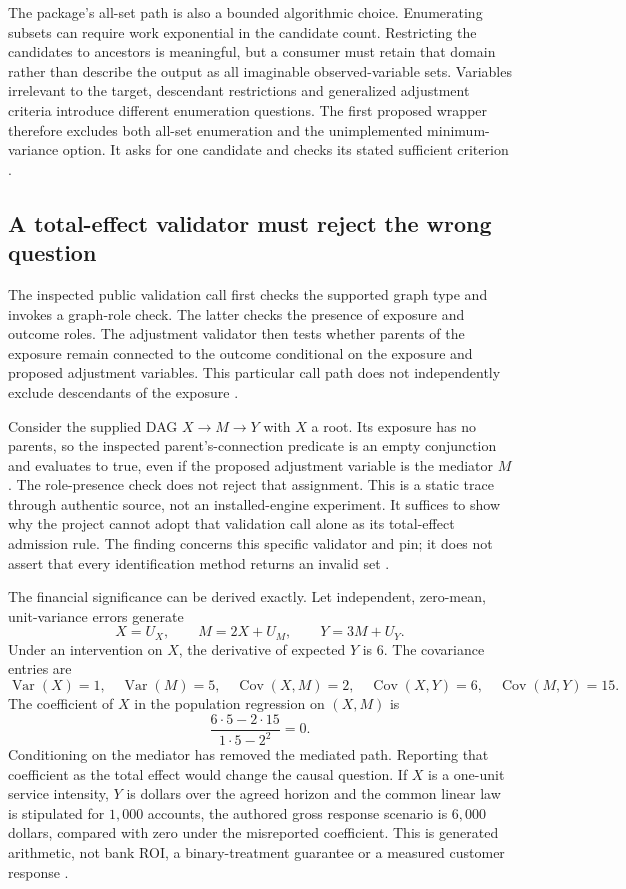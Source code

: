 The package's all-set path is also a bounded algorithmic choice. Enumerating
subsets can require work exponential in the candidate count. Restricting
the candidates to ancestors is meaningful, but a consumer must retain that
domain rather than describe the output as all imaginable observed-variable
sets. Variables irrelevant to the target, descendant restrictions and
generalized adjustment criteria introduce different enumeration questions.
The first proposed wrapper therefore excludes both all-set enumeration and
the unimplemented minimum-variance option. It asks for one candidate and
checks its stated sufficient criterion
\cite{exec13_pgmpy_reuse_primary}.

\subsection{A total-effect validator must reject the wrong question}

The inspected public validation call first checks the supported graph type
and invokes a graph-role check. The latter checks the presence of exposure
and outcome roles. The adjustment validator then tests whether parents of
the exposure remain connected to the outcome conditional on the exposure
and proposed adjustment variables. This particular call path does not
independently exclude descendants of the exposure
\cite{exec13_pgmpy_reuse_primary}.

Consider the supplied DAG $X\to M\to Y$ with $X$ a root. Its exposure
has no parents, so the inspected parent's-connection predicate is an empty
conjunction and evaluates to true, even if the proposed adjustment variable
is the mediator $M$. The role-presence check does not reject that assignment.
This is a static trace through authentic source, not an installed-engine
experiment. It suffices to show why the project cannot adopt that validation
call alone as its total-effect admission rule. The finding concerns this
specific validator and pin; it does not assert that every identification
method returns an invalid set
\cite{exec13_pgmpy_reuse_primary,exec13_pgmpy_reuse_oracle}.

The financial significance can be derived exactly. Let independent,
zero-mean, unit-variance errors generate
\[
 X=U_X,\qquad M=2X+U_M,\qquad Y=3M+U_Y.
\]
Under an intervention on $X$, the derivative of expected $Y$ is $6$.
The covariance entries are
\[
 \operatorname{Var}(X)=1,\quad \operatorname{Var}(M)=5,\quad
 \operatorname{Cov}(X,M)=2,\quad
 \operatorname{Cov}(X,Y)=6,\quad \operatorname{Cov}(M,Y)=15.
\]
The coefficient of $X$ in the population regression on $(X,M)$ is
\[
 \frac{6\cdot5-2\cdot15}{1\cdot5-2^2}=0.
\]
Conditioning on the mediator has removed the mediated path. Reporting that
coefficient as the total effect would change the causal question. If $X$
is a one-unit service intensity, $Y$ is dollars over the agreed horizon and
the common linear law is stipulated for $1{,}000$ accounts, the authored
gross response scenario is $6{,}000$ dollars, compared with zero under the
misreported coefficient. This is generated arithmetic, not bank ROI, a
binary-treatment guarantee or a measured customer response
\cite{exec13_pgmpy_reuse_oracle}.

